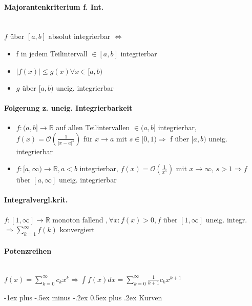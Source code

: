 \documentclass[paper=a3,paper=landscape, fontsize=9pt,DIV=30]{scrartcl}
\makeatletter
\newcommand{\real}{{\mathbb{R}}}
\newcommand{\laO}{\mathcal{O}}
\renewcommand{\section}{\@startsection{section}{1}{0mm}%
  {-1ex plus -.5ex minus -.2ex}%
  {0.5ex plus .2ex}%
  {\color{blue}\normalfont\large\bfseries}}
\makeatother
\begin{document}
\begin{multicols*}{4}
  \paragraph{Majorantenkriterium f. Int.}\hspace{0pt} \\
  $f$ über $[a,b]$ absolut integrierbar $\Leftrightarrow$
  \begin{itemize}
  \item f in jedem Teilintervall $\in [a,b]$ integrierbar
  \item $\lvert f(x) \rvert \leq g(x) \forall x \in [a,b)$
  \item $g$ über $[a,b)$ uneig. integrierbar
  \end{itemize}

	\paragraph{Folgerung z. uneig. Integrierbarkeit}
	\begin{itemize}
		\item $f: (a,b] \rightarrow \real$ auf allen Teilintervallen $\in (a,b]$ integrierbar, $f(x)=\laO(\frac{1}{\lvert x-a \rvert ^s})$ für $x \rightarrow a$ mit $s \in [0,1) \Rightarrow$ f über $[a,b)$ uneig. integrierbar
		\item $f: [a,\infty) \rightarrow \real, a<b$ integrierbar, $f(x)=\laO(\frac{1}{x^s})$ mit $x \rightarrow \infty$, $s > 1 \Rightarrow f$ über $[a,\infty]$ uneig. integrierbar
	\end{itemize}


  \paragraph{Integralvergl.krit.}
  $f:[1,\infty]\rightarrow\real$ monoton fallend $, \forall x: f(x)>0, f$ über $[1,\infty]$ uneig. integr. $\Rightarrow \sum_{k=1}^{\infty}f(k)$ konvergiert


  \paragraph{Potenzreihen}\hspace{0pt} \\
  $f(x)=\sum_{k=0}^{\infty}c_kx^k \Rightarrow \int f(x)dx=\sum_{k=0}^{\infty}\frac{1}{k+1}c_kx^{k+1}$



  \section{Kurven}

\end{multicols*}
\end{document}
